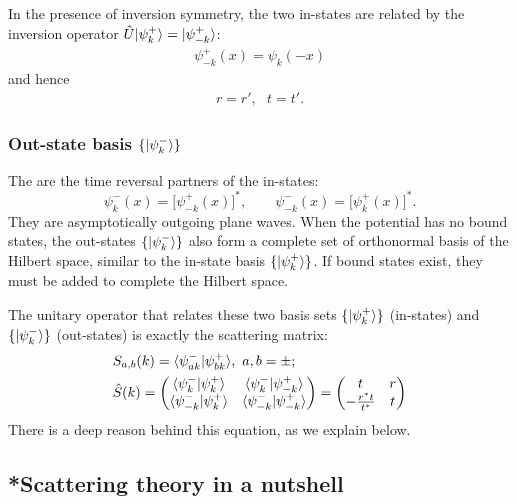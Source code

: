 In the presence of inversion symmetry, the two in-states are related by the inversion operator $\hat U|{\psi_k^+}\rangle=|{\psi_{-k}^+}\rangle$:
\begin{align}
    \psi_{-k}^+(x)=\psi_k(-x)
\end{align}
and hence
\begin{align}
    r=r',~~~t=t'.
\end{align}

\subsubsection{Out-state basis $\{|{\psi_k^-}\rangle\}$}
The  are the time reversal partners of the in-states:
\begin{equation}
 \psi_k^-(x)=\bigl[\psi_{-k}^+(x)\bigr]^*,
 \qquad
 \psi_{-k}^-(x)=\bigl[\psi_k^+(x)\bigr]^*.
\end{equation}
They are asymptotically outgoing plane waves. When the potential has no bound states, the out-states
$\{|{\psi_k^-}\rangle\}$ also form a complete set of orthonormal basis of the Hilbert space, similar to the in-state basis $\{|{\psi_k^+}\rangle\}$. If bound states exist, they must be added to complete the Hilbert space.

The unitary operator that relates these two basis sets $\{|{\psi_k^+}\rangle\}$ (in-states) and $\{|{\psi_k^-}\rangle\}$ (out-states) is exactly the scattering matrix:
\begin{align}
    &S_{a,b}(k)=\langle{\psi^-_{ak}|\psi^+_{bk}}\rangle,~a,b=\pm;\\
    &\hat S(k)=\begin{pmatrix}\langle{\psi^-_{k}|\psi^+_{k}}\rangle&\langle{\psi^-_{k}|\psi^+_{-k}}\rangle\\ \langle{\psi^-_{-k}|\psi^+_{k}}\rangle&\langle{\psi^-_{-k}|\psi^+_{-k}}\rangle\end{pmatrix}=\begin{pmatrix} t&r\\-\frac{r^*t}{t^*}&t\end{pmatrix}
\end{align}
There is a deep reason behind this equation, as we explain below. 

\subsection{*Scattering theory in a nutshell}

